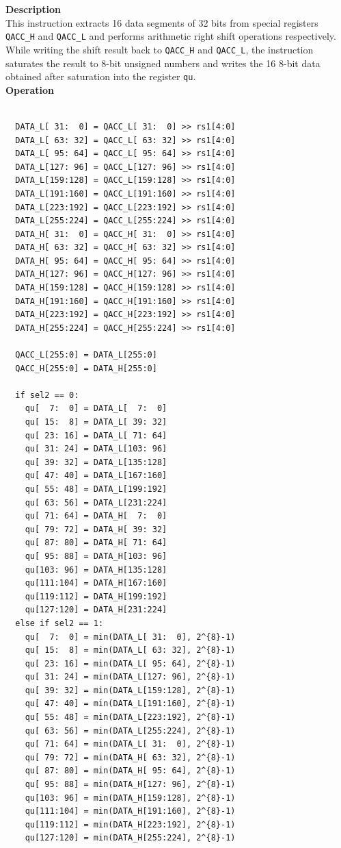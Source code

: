 \textbf{Description}\\
This instruction extracts 16 data segments of 32 bits from special registers \lstinline{QACC_H} and \lstinline{QACC_L} and performs arithmetic right shift operations respectively. While writing the shift result back to \lstinline{QACC_H} and \lstinline{QACC_L}, the instruction saturates the result to 8-bit unsigned numbers and writes the 16 8-bit data obtained after saturation into the register \lstinline{qu}.\\
\textbf{Operation}
\begin{lstlisting}

  DATA_L[ 31:  0] = QACC_L[ 31:  0] >> rs1[4:0]
  DATA_L[ 63: 32] = QACC_L[ 63: 32] >> rs1[4:0]
  DATA_L[ 95: 64] = QACC_L[ 95: 64] >> rs1[4:0]
  DATA_L[127: 96] = QACC_L[127: 96] >> rs1[4:0]
  DATA_L[159:128] = QACC_L[159:128] >> rs1[4:0]
  DATA_L[191:160] = QACC_L[191:160] >> rs1[4:0]
  DATA_L[223:192] = QACC_L[223:192] >> rs1[4:0]
  DATA_L[255:224] = QACC_L[255:224] >> rs1[4:0]
  DATA_H[ 31:  0] = QACC_H[ 31:  0] >> rs1[4:0]
  DATA_H[ 63: 32] = QACC_H[ 63: 32] >> rs1[4:0]
  DATA_H[ 95: 64] = QACC_H[ 95: 64] >> rs1[4:0]
  DATA_H[127: 96] = QACC_H[127: 96] >> rs1[4:0]
  DATA_H[159:128] = QACC_H[159:128] >> rs1[4:0]
  DATA_H[191:160] = QACC_H[191:160] >> rs1[4:0]
  DATA_H[223:192] = QACC_H[223:192] >> rs1[4:0]
  DATA_H[255:224] = QACC_H[255:224] >> rs1[4:0]

  QACC_L[255:0] = DATA_L[255:0]
  QACC_H[255:0] = DATA_H[255:0]

  if sel2 == 0:
    qu[  7:  0] = DATA_L[  7:  0]
    qu[ 15:  8] = DATA_L[ 39: 32]
    qu[ 23: 16] = DATA_L[ 71: 64]
    qu[ 31: 24] = DATA_L[103: 96]
    qu[ 39: 32] = DATA_L[135:128]
    qu[ 47: 40] = DATA_L[167:160]
    qu[ 55: 48] = DATA_L[199:192]
    qu[ 63: 56] = DATA_L[231:224]
    qu[ 71: 64] = DATA_H[  7:  0]
    qu[ 79: 72] = DATA_H[ 39: 32]
    qu[ 87: 80] = DATA_H[ 71: 64]
    qu[ 95: 88] = DATA_H[103: 96]
    qu[103: 96] = DATA_H[135:128]
    qu[111:104] = DATA_H[167:160]
    qu[119:112] = DATA_H[199:192]
    qu[127:120] = DATA_H[231:224]
  else if sel2 == 1:
    qu[  7:  0] = min(DATA_L[ 31:  0], 2^{8}-1)
    qu[ 15:  8] = min(DATA_L[ 63: 32], 2^{8}-1)
    qu[ 23: 16] = min(DATA_L[ 95: 64], 2^{8}-1)
    qu[ 31: 24] = min(DATA_L[127: 96], 2^{8}-1)
    qu[ 39: 32] = min(DATA_L[159:128], 2^{8}-1)
    qu[ 47: 40] = min(DATA_L[191:160], 2^{8}-1)
    qu[ 55: 48] = min(DATA_L[223:192], 2^{8}-1)
    qu[ 63: 56] = min(DATA_L[255:224], 2^{8}-1)
    qu[ 71: 64] = min(DATA_L[ 31:  0], 2^{8}-1)
    qu[ 79: 72] = min(DATA_H[ 63: 32], 2^{8}-1)
    qu[ 87: 80] = min(DATA_H[ 95: 64], 2^{8}-1)
    qu[ 95: 88] = min(DATA_H[127: 96], 2^{8}-1)
    qu[103: 96] = min(DATA_H[159:128], 2^{8}-1)
    qu[111:104] = min(DATA_H[191:160], 2^{8}-1)
    qu[119:112] = min(DATA_H[223:192], 2^{8}-1)
    qu[127:120] = min(DATA_H[255:224], 2^{8}-1)

\end{lstlisting}

